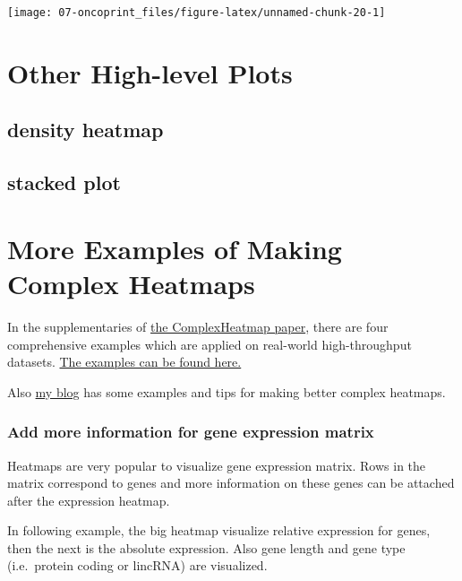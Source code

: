 \documentclass[]{book}
\theoremstyle{definition}
\theoremstyle{definition}
\theoremstyle{definition}
\theoremstyle{remark}
\begin{document}
\begin{center}\texttt{[image: 07-oncoprint\_files/figure-latex/unnamed-chunk-20-1]} \end{center}

\chapter{Other High-level Plots}\label{other-high-level-plots}

\section{density heatmap}\label{density-heatmap}

\section{stacked plot}\label{stacked-plot}

\chapter{More Examples of Making Complex
Heatmaps}\label{more-examples-of-making-complex-heatmaps}

In the supplementaries of
\href{http://bioinformatics.oxfordjournals.org/content/early/2016/05/20/bioinformatics.btw313.abstract}{the
ComplexHeatmap paper}, there are four comprehensive examples which are
applied on real-world high-throughput datasets.
\href{http://jokergoo.github.io/supplementary/ComplexHeatmap-supplementary1-4/index.html}{The
examples can be found here.}

Also \href{http://jokergoo.github.io/blog.html}{my blog} has some
examples and tips for making better complex heatmaps.

\subsection{Add more information for gene expression
matrix}\label{add-more-information-for-gene-expression-matrix}

Heatmaps are very popular to visualize gene expression matrix. Rows in
the matrix correspond to genes and more information on these genes can
be attached after the expression heatmap.

In following example, the big heatmap visualize relative expression for
genes, then the next is the absolute expression. Also gene length and
gene type (i.e.~protein coding or lincRNA) are visualized.
\end{document}
